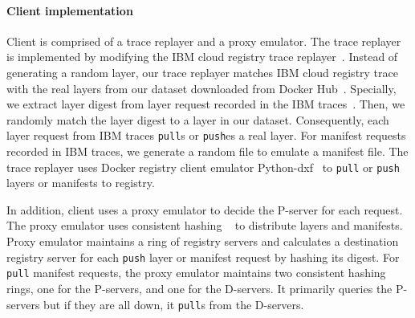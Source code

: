 
\paragraph{Client implementation}
Client is comprised of a trace replayer and a proxy emulator.
The trace replayer is implemented by modifying the IBM cloud registry trace replayer~\cite{dockerworkload}.
Instead of generating a random layer,
our trace replayer matches IBM cloud registry trace with
the real layers from our dataset downloaded from Docker Hub~\cite{dedupanalysis}.
Specially, we extract layer digest from layer request recorded in the IBM traces~\cite{dockerworkload}.
Then, 
we randomly match the layer digest to a layer in our dataset. 
Consequently, each layer request from IBM traces \texttt{pull}s or \texttt{push}es a real layer.
For manifest requests recorded in IBM traces, we generate a random file to emulate a manifest file.
The trace replayer uses Docker registry client emulator Python-dxf~\cite{pydxf} to 
\texttt{pull} or \texttt{push} layers or manifests to registry.

In addition, client uses a proxy emulator to decide %
the P-server for each request.
The proxy emulator uses
consistent hashing ~\cite{kargercons} to distribute layers and manifests.
Proxy emulator maintains a ring of registry servers
and calculates a destination registry server for each \texttt{push} layer or manifest request
 by hashing its digest. For \texttt{pull} manifest requests, the proxy emulator maintains two consistent hashing rings, one for the P-servers, and one for the D-servers. It primarily queries the P-servers but if they are all down, 
 it \texttt{pull}s from the D-servers.


